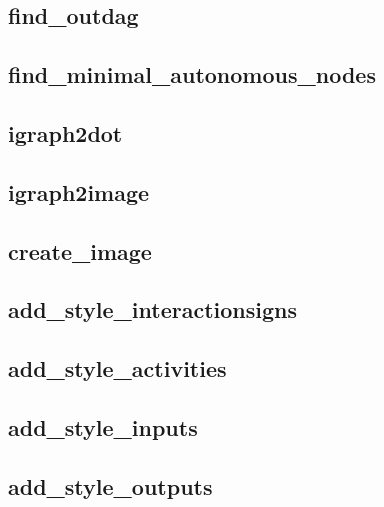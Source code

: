 \documentclass[letterpaper,10pt,english]{sphinxmanual}
\begin{document}
\subsection{find\_outdag}
\label{InteractionGraphs:find-outdag}\label{InteractionGraphs:id3}

\subsection{find\_minimal\_autonomous\_nodes}
\label{InteractionGraphs:find-minimal-autonomous-nodes}\label{InteractionGraphs:id4}

\subsection{igraph2dot}
\label{InteractionGraphs:id5}\label{InteractionGraphs:igraph2dot}

\subsection{igraph2image}
\label{InteractionGraphs:id6}\label{InteractionGraphs:igraph2image}

\subsection{create\_image}
\label{InteractionGraphs:id7}\label{InteractionGraphs:create-image}

\subsection{add\_style\_interactionsigns}
\label{InteractionGraphs:add-style-interactionsigns}\label{InteractionGraphs:id8}

\subsection{add\_style\_activities}
\label{InteractionGraphs:add-style-activities}\label{InteractionGraphs:id9}

\subsection{add\_style\_inputs}
\label{InteractionGraphs:id10}\label{InteractionGraphs:add-style-inputs}

\subsection{add\_style\_outputs}
\label{InteractionGraphs:id11}\label{InteractionGraphs:add-style-outputs}
\end{document}
